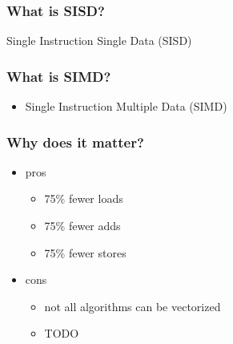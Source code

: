 \documentclass{beamer}
\begin{document}
  	\begin{frame}
    		\frametitle{What is SISD?}
    		Single Instruction Single Data (SISD)
    		\vskip15pt 

		
  	\end{frame}
  	\begin{frame}
    		\frametitle{What is SIMD?}
    		\begin{itemize}
    		    \item Single Instruction Multiple Data (SIMD)
		    
		\end{itemize}
  	\end{frame}
  	\begin{frame}
    		\frametitle{Why does it matter?}
    		\begin{itemize}
    		    \item pros
    		    \begin{itemize}
    		    		\item 75\% fewer loads
    		    		\item 75\% fewer adds
    		    		\item 75\% fewer stores
    		    \end{itemize}
    		    \item cons
    		    \begin{itemize}
    		    		\item not all algorithms can be vectorized
    		    		\item {\color{red!100}TODO}
    		    \end{itemize}
		\end{itemize}
  	\end{frame}  	
\end{document}
